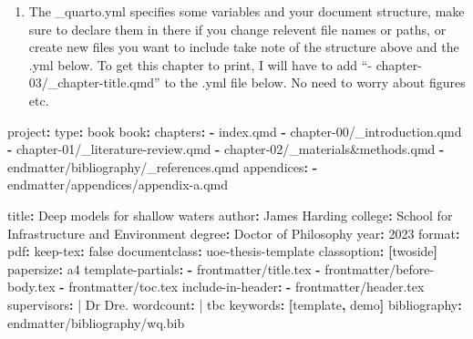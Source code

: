 \documentclass[
  a4paper,
  twoside]{uoe-thesis-template}
\newenvironment{Shaded}{\begin{snugshade}}{\end{snugshade}}
\newcommand{\AttributeTok}[1]{\textcolor[rgb]{0.40,0.45,0.13}{#1}}
\newcommand{\CharTok}[1]{\textcolor[rgb]{0.13,0.47,0.30}{#1}}
\newcommand{\DecValTok}[1]{\textcolor[rgb]{0.68,0.00,0.00}{#1}}
\newcommand{\FunctionTok}[1]{\textcolor[rgb]{0.28,0.35,0.67}{#1}}
\newcommand{\KeywordTok}[1]{\textcolor[rgb]{0.00,0.23,0.31}{\textbf{#1}}}
\newcommand{\NormalTok}[1]{\textcolor[rgb]{0.00,0.23,0.31}{#1}}
\providecommand{\tightlist}{%
  \setlength{\itemsep}{0pt}\setlength{\parskip}{0pt}}\usepackage{longtable,booktabs,array}
\begin{document}
\begin{enumerate}
\def\labelenumi{\arabic{enumi}.}
\setcounter{enumi}{3}
\tightlist
\item
  The \_quarto.yml specifies some variables and your document structure,
  make sure to declare them in there if you change relevent file names
  or paths, or create new files you want to include take note of the
  structure above and the .yml below. To get this chapter to print, I
  will have to add ``- chapter-03/\_chapter-title.qmd'' to the .yml file
  below. No need to worry about figures etc.
\end{enumerate}

\begin{Shaded}
\begin{Highlighting}[]
\FunctionTok{project}\KeywordTok{:}
\AttributeTok{  }\FunctionTok{type}\KeywordTok{:}\AttributeTok{ book}
\FunctionTok{book}\KeywordTok{:}
\AttributeTok{  }\FunctionTok{chapters}\KeywordTok{:}
\AttributeTok{    }\KeywordTok{{-}}\AttributeTok{ index.qmd}
\AttributeTok{    }\KeywordTok{{-}}\AttributeTok{ chapter{-}00/\_introduction.qmd}
\AttributeTok{    }\KeywordTok{{-}}\AttributeTok{ chapter{-}01/\_literature{-}review.qmd}
\AttributeTok{    }\KeywordTok{{-}}\AttributeTok{ chapter{-}02/\_materials\&methods.qmd}
\AttributeTok{    }\KeywordTok{{-}}\AttributeTok{ endmatter/bibliography/\_references.qmd}
\AttributeTok{  }\FunctionTok{appendices}\KeywordTok{:}
\AttributeTok{    }\KeywordTok{{-}}\AttributeTok{ endmatter/appendices/appendix{-}a.qmd}

\FunctionTok{title}\KeywordTok{:}\AttributeTok{ Deep models for shallow waters}
\FunctionTok{author}\KeywordTok{:}\AttributeTok{ James Harding}
\FunctionTok{college}\KeywordTok{:}\AttributeTok{ School for Infrastructure and Environment}
\FunctionTok{degree}\KeywordTok{:}\AttributeTok{ Doctor of Philosophy}
\FunctionTok{year}\KeywordTok{:}\AttributeTok{ }\DecValTok{2023}
\FunctionTok{format}\KeywordTok{:}
\AttributeTok{  }\FunctionTok{pdf}\KeywordTok{:}
\AttributeTok{    }\FunctionTok{keep{-}tex}\KeywordTok{:}\AttributeTok{ }\CharTok{false}\AttributeTok{ }
\AttributeTok{    }\FunctionTok{documentclass}\KeywordTok{:}\AttributeTok{ uoe{-}thesis{-}template}
\AttributeTok{    }\FunctionTok{classoption}\KeywordTok{:}\AttributeTok{ }\KeywordTok{[}\AttributeTok{twoside}\KeywordTok{]}
\AttributeTok{    }\FunctionTok{papersize}\KeywordTok{:}\AttributeTok{ a4}
\AttributeTok{    }\FunctionTok{template{-}partials}\KeywordTok{:}
\AttributeTok{    }\KeywordTok{{-}}\AttributeTok{ frontmatter/title.tex}
\AttributeTok{    }\KeywordTok{{-}}\AttributeTok{ frontmatter/before{-}body.tex}
\AttributeTok{    }\KeywordTok{{-}}\AttributeTok{ frontmatter/toc.tex}
\AttributeTok{    }\FunctionTok{include{-}in{-}header}\KeywordTok{:}
\AttributeTok{    }\KeywordTok{{-}}\AttributeTok{ frontmatter/header.tex}
\FunctionTok{supervisors}\KeywordTok{: }\CharTok{|}
\NormalTok{  Dr Dre.}
\FunctionTok{wordcount}\KeywordTok{: }\CharTok{|}
\NormalTok{  tbc}
\FunctionTok{keywords}\KeywordTok{:}\AttributeTok{ }\KeywordTok{[}\AttributeTok{template}\KeywordTok{,}\AttributeTok{ demo}\KeywordTok{]}
\FunctionTok{bibliography}\KeywordTok{:}\AttributeTok{ endmatter/bibliography/wq.bib}
\end{Highlighting}
\end{Shaded}
\end{document}
